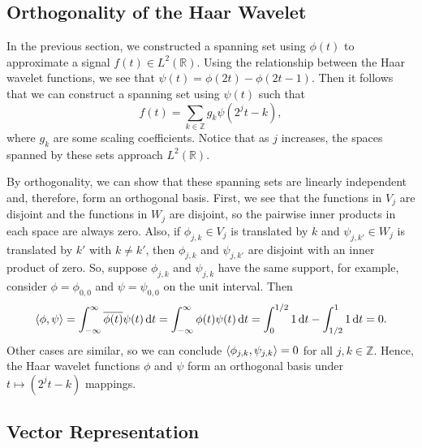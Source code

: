 \documentclass{article}
\DeclarePairedDelimiter{\iprod}{\langle}{\rangle}
\def\RR{\mathbb{R}}
\def\ZZ{\mathbb{Z}}
\theoremstyle{definition}
\begin{document}
  \subsection{Orthogonality of the Haar Wavelet}

  In the previous section, we constructed a spanning set using \(\phi(t)\) to approximate a signal \(f(t) \in L^2(\RR)\). Using the relationship between the Haar wavelet functions, we see that \(\psi(t) = \phi(2t) - \phi(2t-1)\). Then it follows that we can construct a spanning set using \(\psi(t)\) such that
  \[f(t) = \sum_{k \in \ZZ} g_k \psi(2^jt-k),\]
  where \(g_k\) are some scaling coefficients. Notice that as \(j\) increases, the spaces spanned by these sets approach \(L^2(\RR)\).

  By orthogonality, we can show that these spanning sets are linearly independent and, therefore, form an orthogonal basis. First, we see that the functions in \(V_j\) are disjoint and the functions in \(W_j\) are disjoint, so the pairwise inner products in each space are always zero. Also, if \(\phi_{j,k} \in V_j\) is translated by \(k\) and \(\psi_{j,k'} \in W_j\) is translated by \(k'\) with \(k \neq k'\), then \(\phi_{j,k}\) and \(\psi_{j,k'}\) are disjoint with an inner product of zero. So, suppose \(\phi_{j,k}\) and \(\psi_{j,k}\) have the same support, for example, consider \(\phi = \phi_{0,0}\) and \(\psi = \psi_{0,0}\) on the unit interval. Then
  \[\iprod{\phi,\psi}
    = \int_{-\infty}^\infty \overline{\phi(t)} \psi(t) \dd{t}
    = \int_{-\infty}^\infty \phi(t) \psi(t) \dd{t}
    = \int_{0}^{1/2}1 \dd{t} - \int_{1/2}^{1}1 \dd{t}
    = 0.\]
  Other cases are similar, so we can conclude \(\iprod{\phi_{j,k},\psi_{j,k}} = 0\) for all \(j,k \in \ZZ\). Hence, the Haar wavelet functions \(\phi\) and \(\psi\) form an orthogonal basis under \(t \mapsto (2^jt-k)\) mappings.
  
  \subsection{Vector Representation}
  
\end{document}

